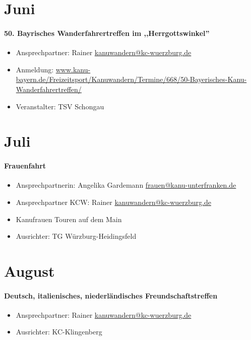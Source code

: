 \documentclass[12pt, a4paper]{report}
\begin{document}
\section*{Juni}\paragraph{50. Bayrisches Wanderfahrertreffen im ,,Herrgottswinkel''}
\begin{itemize}
    \item Ansprechpartner: Rainer \href{mailto:kanuwandern@kc-wuerzburg.de}{kanuwandern@kc-wuerzburg.de}
    \item Anmeldung: \url{www.kanu-bayern.de/Freizeitsport/Kanuwandern/Termine/668/50-Bayerisches-Kanu-Wanderfahrertreffen/}
    \item Veranstalter: TSV Schongau
\end{itemize}

\section*{Juli}\paragraph{Frauenfahrt}
\begin{itemize}
    \item Ansprechpartnerin: Angelika Gardemann \href{mailto:frauen@kanu-unterfranken.de}{frauen@kanu-unterfranken.de}
    \item Ansprechpartner KCW: Rainer \href{mailto:kanuwandern@kc-wuerzburg.de}{kanuwandern@kc-wuerzburg.de}
    \item Kanufrauen Touren auf dem Main
    \item Ausrichter: TG Würzburg-Heidingsfeld
\end{itemize}

\section*{August}\paragraph{Deutsch, italienisches, niederländisches Freundschaftstreffen}
\begin{itemize}
    \item Ansprechpartner: Rainer \href{mailto:kanuwandern@kc-wuerzburg.de}{kanuwandern@kc-wuerzburg.de}
    \item Ausrichter: KC-Klingenberg
\end{itemize}
\end{document}
